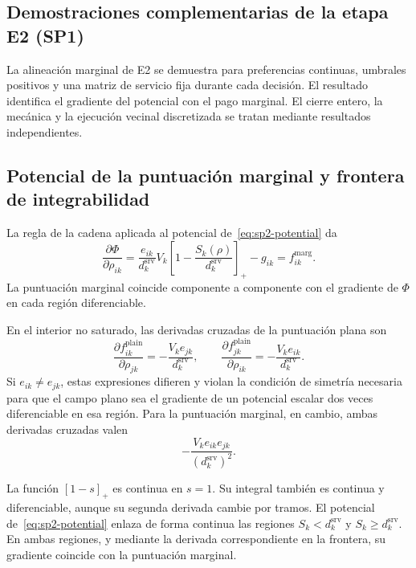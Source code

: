 \subsection{Demostraciones complementarias de la etapa E2 (SP1)}
\label{app:sp2-proofs}

La alineación marginal de E2 se demuestra para preferencias continuas, umbrales positivos y una matriz de servicio fija durante cada decisión. El resultado identifica el gradiente del potencial con el pago marginal. El cierre entero, la mecánica y la ejecución vecinal discretizada se tratan mediante resultados independientes.

\subsection{Potencial de la puntuación marginal y frontera de integrabilidad}
\label{app:sp2-marginal-proof}

La regla de la cadena aplicada al potencial de~\eqref{eq:sp2-potential} da
\[
  \frac{\partial\Phi}{\partial\rho_{ik}}
  =\frac{e_{ik}}{d_k^{\mathrm{srv}}}V_k
   \left[1-\frac{S_k(\rho)}{d_k^{\mathrm{srv}}}\right]_+-g_{ik}
  =f_{ik}^{\mathrm{marg}}.
\]
La puntuación marginal coincide componente a componente con el gradiente de $\Phi$ en cada región diferenciable.

En el interior no saturado, las derivadas cruzadas de la puntuación plana son
\[
  \frac{\partial f_{ik}^{\mathrm{plain}}}{\partial\rho_{jk}}
  =-\frac{V_ke_{jk}}{d_k^{\mathrm{srv}}},
  \qquad
  \frac{\partial f_{jk}^{\mathrm{plain}}}{\partial\rho_{ik}}
  =-\frac{V_ke_{ik}}{d_k^{\mathrm{srv}}}.
\]
Si $e_{ik}\neq e_{jk}$, estas expresiones difieren y violan la condición de simetría necesaria para que el campo plano sea el gradiente de un potencial escalar dos veces diferenciable en esa región. Para la puntuación marginal, en cambio, ambas derivadas cruzadas valen
\[
  -\frac{V_ke_{ik}e_{jk}}{(d_k^{\mathrm{srv}})^2}.
\]

La función $[1-s]_+$ es continua en $s=1$. Su integral también es continua y diferenciable, aunque su segunda derivada cambie por tramos. El potencial de~\eqref{eq:sp2-potential} enlaza de forma continua las regiones $S_k<d_k^{\mathrm{srv}}$ y $S_k\geq d_k^{\mathrm{srv}}$. En ambas regiones, y mediante la derivada correspondiente en la frontera, su gradiente coincide con la puntuación marginal.
